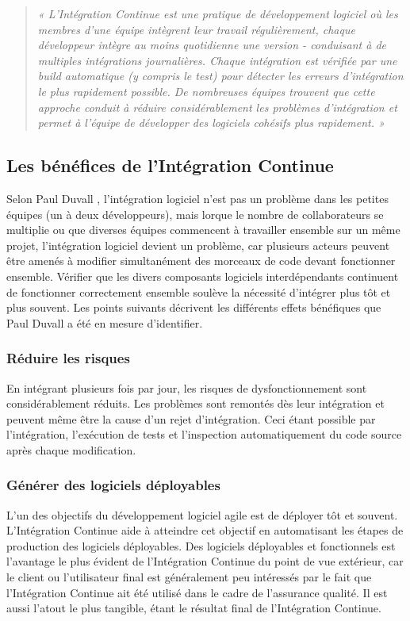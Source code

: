   \begin{quotation}
    \emph{« L'Intégration Continue est une pratique de développement logiciel où les membres d'une équipe intègrent leur travail régulièrement, chaque développeur intègre au moins quotidienne une version - conduisant à de multiples intégrations journalières. Chaque intégration est vérifiée par une build automatique (y compris le test) pour détecter les erreurs d'intégration le plus rapidement possible. De nombreuses équipes trouvent que cette approche conduit à réduire considérablement les problèmes d'intégration et permet à l'équipe de développer des logiciels cohésifs plus rapidement. »}\\
  \end{quotation}

    \subsection{Les bénéfices de l’Intégration Continue}\label{Benefits}
    Selon Paul Duvall \cite{Duv07}, l'intégration logiciel n’est pas un problème dans les petites équipes (un à deux développeurs), mais lorque le nombre de collaborateurs se multiplie ou que diverses équipes commencent à travailler ensemble sur un même projet, l'intégration logiciel devient un problème, car plusieurs acteurs peuvent être amenés à modifier simultanément des morceaux de code devant fonctionner ensemble. Vérifier que les divers composants logiciels interdépendants continuent de fonctionner correctement ensemble soulève la nécessité d'intégrer plus tôt et plus souvent. Les points suivants décrivent les différents effets bénéfiques que Paul Duvall a été en mesure d'identifier.

      \subsubsection{Réduire les risques}
      En intégrant plusieurs fois par jour, les risques de dysfonctionnement sont considérablement réduits. Les problèmes sont remontés dès leur intégration et peuvent même être la cause d’un rejet d’intégration. Ceci étant possible par l’intégration, l’exécution de tests et l’inspection automatiquement du code source après chaque modification.

      \subsubsection{Générer des logiciels déployables}
      L'un des objectifs du développement logiciel agile est de déployer tôt et souvent. L’Intégration Continue aide à atteindre cet objectif en automatisant les étapes de production des logiciels déployables. Des logiciels déployables et fonctionnels est l'avantage le plus évident de l’Intégration Continue du point de vue extérieur, car le client ou l'utilisateur final est généralement peu intéressés par le fait que l’Intégration Continue ait été utilisé dans le cadre de l'assurance qualité. Il est aussi l'atout le plus tangible, étant le résultat final de l’Intégration Continue.

